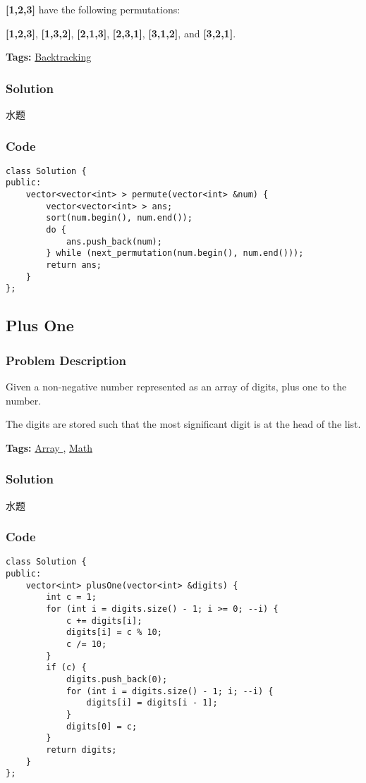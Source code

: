 \documentclass{article}
\begin{document}
\begin{CJK*}{UTF8}{gkai}
\textbf{[1,2,3]} have the following permutations:


\textbf{[1,2,3]}, \textbf{[1,3,2]}, \textbf{[2,1,3]}, \textbf{[2,3,1]}, \textbf{[3,1,2]}, and \textbf{[3,2,1]}.


\textbf{Tags: }
\hyperref[ Backtracking ]{ Backtracking }



\subsubsection*{Solution}
水题

\subsubsection*{Code}
\begin{lstlisting}
class Solution {
public:
    vector<vector<int> > permute(vector<int> &num) {
        vector<vector<int> > ans;
        sort(num.begin(), num.end());
        do {
            ans.push_back(num);
        } while (next_permutation(num.begin(), num.end()));
        return ans;
    }
}; 
\end{lstlisting}


\subsection{ Plus One }
\label{ Plus One }

\subsubsection*{Problem Description}
Given a non-negative number represented as an array of digits, plus one to the number.

The digits are stored such that the most significant digit is at the head of the list.


\textbf{Tags: }
\hyperref[ Array ]{ Array },  \hyperref[ Math ]{ Math }



\subsubsection*{Solution}
水题

\subsubsection*{Code}
\begin{lstlisting}
class Solution {
public:
    vector<int> plusOne(vector<int> &digits) {
        int c = 1;
        for (int i = digits.size() - 1; i >= 0; --i) {
            c += digits[i];
            digits[i] = c % 10;
            c /= 10;
        }
        if (c) {
            digits.push_back(0);
            for (int i = digits.size() - 1; i; --i) {
                digits[i] = digits[i - 1];
            }
            digits[0] = c;
        }
        return digits;
    }
}; 
\end{lstlisting}



\end{CJK*}
\end{document}
